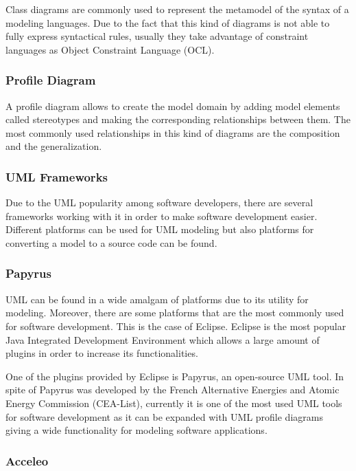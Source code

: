Class diagrams are commonly used to represent the metamodel of the syntax of a modeling languages. Due to the fact that this kind of diagrams is not able to fully express syntactical rules, usually they take advantage of constraint languages as Object Constraint Language (OCL).

\subsubsection*{Profile Diagram}

A profile diagram allows to create the model domain by adding model elements called stereotypes and making the corresponding relationships between them. The most commonly used relationships in this kind of diagrams are the composition and the generalization.

\subsubsection{UML Frameworks}

Due to the UML popularity among software developers, there are several frameworks working with it in order to make software development easier. Different platforms can be used for UML modeling but also platforms for converting a model to a source code can be found.

\subsubsection*{Papyrus}

UML can be found in a wide amalgam of platforms due to its utility for modeling. Moreover, there are some platforms that are the most commonly used for software development. This is the case of Eclipse.  Eclipse is the most popular Java Integrated Development Environment which allows a large amount of plugins in order to increase its functionalities.

One of the plugins provided by Eclipse is Papyrus, an open-source UML tool. In spite of Papyrus was developed by the French Alternative Energies and Atomic Energy Commission (CEA-List), currently it is one of the most used UML tools for software development as it can be expanded with UML profile diagrams giving a wide functionality for modeling software applications.

\subsubsection*{Acceleo}

